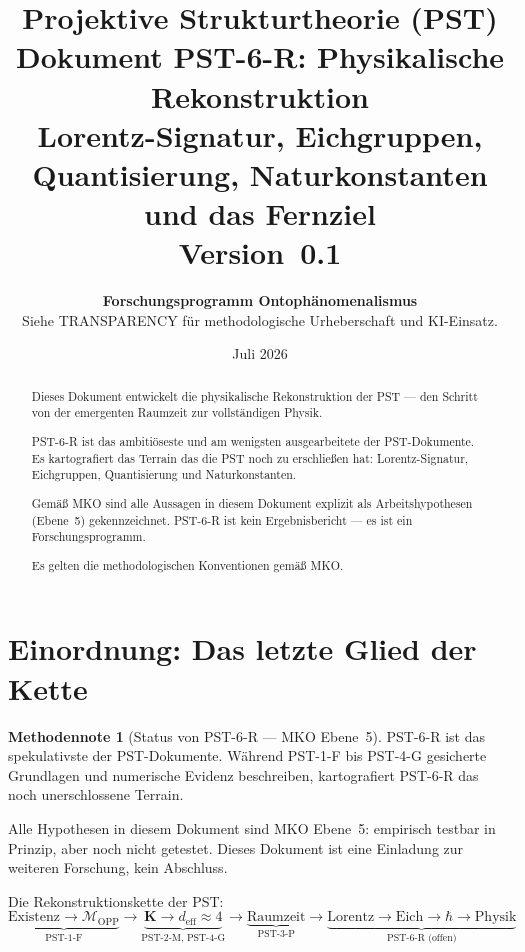 \documentclass[11pt,a4paper]{article}
\title{
  \textbf{Projektive Strukturtheorie (PST)}\\[0.4em]
  \textbf{Dokument PST-6-R: Physikalische Rekonstruktion}\\[0.4em]
  {\large Lorentz-Signatur, Eichgruppen, Quantisierung,
  Naturkonstanten und das Fernziel}\\[0.5em]
  {\normalsize Version~0.1}
}
\author{
  \textbf{Forschungsprogramm Ontoph\"{a}nomenalismus}\\
  \small Siehe TRANSPARENCY f\"{u}r methodologische Urheberschaft
  und KI-Einsatz.
}
\date{Juli 2026}
\theoremstyle{plain}
\theoremstyle{definition}
\newtheorem{methodennote}{Methodennote}[section]
\newcommand{\OPP}{\mathcal{M}_{\mathrm{OPP}}}
\newcommand{\deff}{d_{\mathrm{eff}}}
\begin{document}
\maketitle

\begin{abstract}
Dieses Dokument entwickelt die physikalische Rekonstruktion der PST ---
den Schritt von der emergenten Raumzeit zur vollst\"{a}ndigen Physik.

PST-6-R ist das ambiti\"{o}seste und am wenigsten ausgearbeitete
der PST-Dokumente. Es kartografiert das Terrain das die PST noch
zu erschlie\ss{}en hat: Lorentz-Signatur, Eichgruppen, Quantisierung
und Naturkonstanten.

Gem\"{a}\ss{} MKO sind alle Aussagen in diesem Dokument explizit als
Arbeitshypothesen (Ebene~5) gekennzeichnet. PST-6-R ist kein Ergebnisbericht
--- es ist ein Forschungsprogramm.

Es gelten die methodologischen Konventionen gem\"{a}\ss{} MKO.
\end{abstract}

\tableofcontents
\newpage

\section{Einordnung: Das letzte Glied der Kette}

\begin{methodennote}[Status von PST-6-R --- MKO Ebene~5]
PST-6-R ist das spekulativste der PST-Dokumente. W\"{a}hrend PST-1-F
bis PST-4-G gesicherte Grundlagen und numerische Evidenz beschreiben,
kartografiert PST-6-R das noch unerschlossene Terrain.

Alle Hypothesen in diesem Dokument sind MKO Ebene~5: empirisch testbar
in Prinzip, aber noch nicht getestet. Dieses Dokument ist eine
Einladung zur weiteren Forschung, kein Abschluss.
\end{methodennote}

Die Rekonstruktionskette der PST:
\[
  \underbrace{\text{Existenz} \rightarrow \OPP}_{\text{PST-1-F}}
  \rightarrow
  \underbrace{\mathbf{K} \rightarrow \deff \approx 4}_{\text{PST-2-M, PST-4-G}}
  \rightarrow
  \underbrace{\text{Raumzeit}}_{\text{PST-3-P}}
  \rightarrow
  \underbrace{\text{Lorentz} \rightarrow \text{Eich} \rightarrow \hbar
  \rightarrow \text{Physik}}_{\text{PST-6-R (offen)}}
\]

\end{document}
